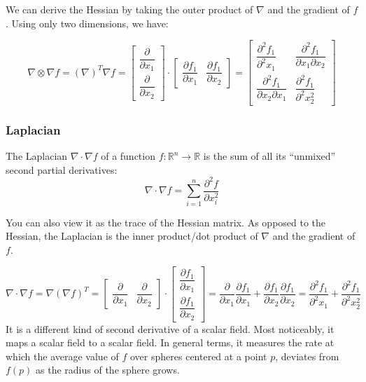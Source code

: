 \documentclass{article}
\begin{document}
We can derive the Hessian by taking the outer product of $\nabla$ and the
gradient of $f$. Using only two dimensions, we have:

\[
\nabla \otimes \nabla f = (\nabla)^T \nabla{f} = 
    \begin{bmatrix}
        \dfrac{\partial }{\partial x_1} \\ 
        \dfrac{\partial }{\partial x_2}
    \end{bmatrix} \cdot
    \begin{bmatrix}
        \dfrac{\partial f_1}{\partial x_1} &
        \dfrac{\partial f_1}{\partial x_2}
    \end{bmatrix} =
    \begin{bmatrix}
        \dfrac{\partial^2 f_1}{\partial^2 x_1} &
        \dfrac{\partial^2 f_1}{\partial x_1 \partial x_2} \\ 
        \dfrac{\partial^2 f_1}{\partial x_2 \partial x_1} &
        \dfrac{\partial^2 f_1}{\partial^2 x_2^2}
    \end{bmatrix}
\]

\subsubsection{Laplacian}
The Laplacian $\nabla \cdot \nabla f$ of a function $ f: \mathbb{R}^n
\longrightarrow \mathbb{R}$ is the sum of all its ``unmixed'' second partial
derivatives:
\[
\nabla \cdot \nabla f = \sum_{i=1}^n \frac {\partial^2 f}{\partial x^2_i}
\]

You can also view it as the trace of the Hessian matrix. As opposed to the
Hessian, the Laplacian is the inner product/dot product of $\nabla$
and the gradient of $f$.

\[
\nabla \cdot \nabla f = \nabla (\nabla{f})^T = 
    \begin{bmatrix}
        \dfrac{\partial }{\partial x_1} & 
        \dfrac{\partial }{\partial x_2}
    \end{bmatrix} \cdot
    \begin{bmatrix}
        \dfrac{\partial f_1}{\partial x_1} \\
        \dfrac{\partial f_1}{\partial x_2}
    \end{bmatrix} =
    \dfrac{\partial }{\partial x_1} \dfrac{\partial f_1}{\partial x_1} +
    \dfrac{\partial f_1}{\partial x_2} \dfrac{\partial f_1}{\partial x_2} = 
    \dfrac{\partial^2 f_1}{\partial^2 x_1} + \dfrac{\partial^2 f_1}{\partial^2 x_2^2}
\]
It is a different kind of second derivative of a scalar field. Most noticeably,
it maps a scalar field to a scalar field. In general terms, it measures the rate at
which the average value of $f$ over spheres centered at a point $p$, deviates
from $f(p)$ as the radius of the sphere grows.
\end{document}

